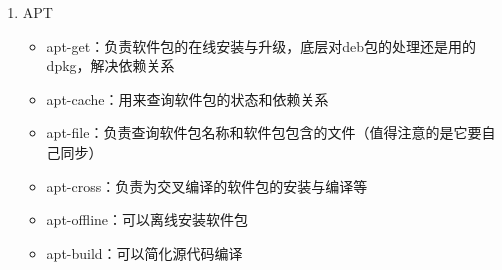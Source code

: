 \documentclass{TIJMUjiaoanSY}
\begin{document}
\begin{enumerate}
\begin{enumerate}
\begin{enumerate}
          \item APT
	    \begin{itemize}
	      \item apt-get：负责软件包的在线安装与升级，底层对deb包的处理还是用的dpkg，解决依赖关系
              \item apt-cache：用来查询软件包的状态和依赖关系
              \item apt-file：负责查询软件包名称和软件包包含的文件（值得注意的是它要自己同步）
              \item apt-cross：负责为交叉编译的软件包的安装与编译等
	      \item apt-offline：可以离线安装软件包
              \item apt-build：可以简化源代码编译
            \end{itemize}
        \end{enumerate}

\otherTail
\newpage
\otherHeader


\end{enumerate}
\end{enumerate}
\end{document}

